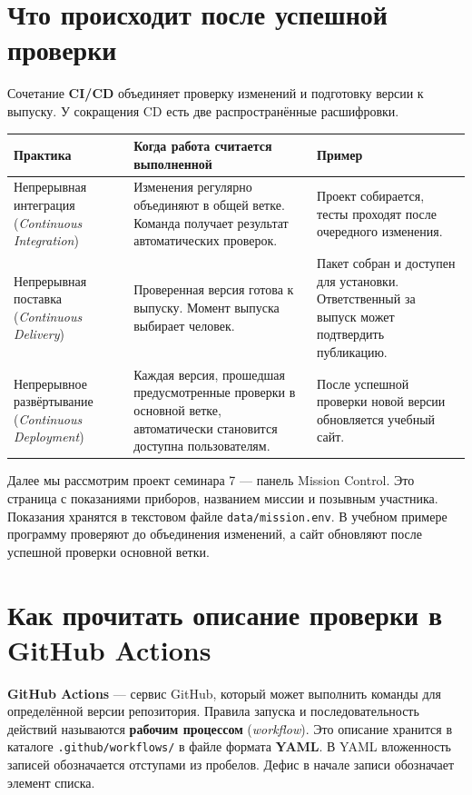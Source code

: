 \section{Что происходит после успешной проверки}

Сочетание \textbf{CI/CD} объединяет проверку изменений и подготовку версии к выпуску. У сокращения CD есть две распространённые расшифровки.

\begin{longtable}{>{\raggedright\arraybackslash}p{}>{\raggedright\arraybackslash}p{}>{\raggedright\arraybackslash}p{}}
\toprule
Практика & Когда работа считается выполненной & Пример \\
\midrule
\endhead
Непрерывная интеграция (\emph{Continuous Integration}) & Изменения регулярно объединяют в общей ветке. Команда получает результат автоматических проверок. & Проект собирается, тесты проходят после очередного изменения. \\
Непрерывная поставка (\emph{Continuous Delivery}) & Проверенная версия готова к выпуску. Момент выпуска выбирает человек. & Пакет собран и доступен для установки. Ответственный за выпуск может подтвердить публикацию. \\
Непрерывное развёртывание (\emph{Continuous Deployment}) & Каждая версия, прошедшая предусмотренные проверки в основной ветке, автоматически становится доступна пользователям. & После успешной проверки новой версии обновляется учебный сайт. \\
\bottomrule
\end{longtable}

Далее мы рассмотрим проект семинара 7 — панель Mission Control. Это страница с показаниями приборов, названием миссии и позывным участника. Показания хранятся в текстовом файле \texttt{data/mission.env}. В учебном примере программу проверяют до объединения изменений, а сайт обновляют после успешной проверки основной ветки.

\section{Как прочитать описание проверки в GitHub Actions}

\textbf{GitHub Actions} — сервис GitHub, который может выполнить команды для определённой версии репозитория. Правила запуска и последовательность действий называются \textbf{рабочим процессом} (\emph{workflow}). Это описание хранится в каталоге \texttt{.github/workflows/} в файле формата \textbf{YAML}. В YAML вложенность записей обозначается отступами из пробелов. Дефис в начале записи обозначает элемент списка.

